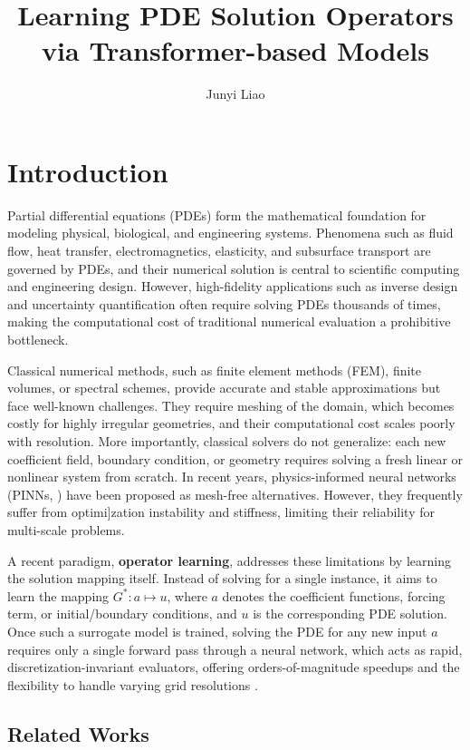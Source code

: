\documentclass[11pt]{article}
\title{\bf Learning PDE Solution Operators via Transformer-based Models}
\author{Junyi Liao}
\date{}
\begin{document}
\maketitle

\section{Introduction}
Partial differential equations (PDEs) form the mathematical foundation for modeling physical, biological, and engineering systems. Phenomena such as fluid flow, heat transfer, electromagnetics, elasticity, and subsurface transport are governed by PDEs, and their numerical solution is central to scientific computing and engineering design. However, high-fidelity applications such as inverse design and uncertainty quantification often require solving PDEs thousands of times, making the computational cost of traditional numerical evaluation a prohibitive bottleneck.

Classical numerical methods, such as finite element methods (FEM), finite volumes, or spectral schemes, provide accurate and stable approximations but face well-known challenges. They require meshing of the domain, which becomes costly for highly irregular geometries, and their computational cost scales poorly with resolution. More importantly, classical solvers do not generalize: each new coefficient field, boundary condition, or geometry requires solving a fresh linear or nonlinear system from scratch. In recent years, physics-informed neural networks (PINNs, \citealp{raissi2019physics}) have been proposed as mesh-free alternatives. However, they frequently suffer from optimi]zation instability and stiffness, limiting their reliability for multi-scale problems.

A recent paradigm, \textbf{operator learning}, addresses these limitations by learning the solution mapping itself. Instead of solving for a single instance, it  aims to learn the mapping $G^*:a\mapsto u$, where $a$ denotes the coefficient functions, forcing term, or initial/boundary conditions, and $u$ is the corresponding PDE solution. Once such a surrogate model is trained, solving the PDE for any new input $a$ requires only a single forward pass through a neural network, which acts as rapid, discretization-invariant evaluators, offering orders-of-magnitude speedups and the flexibility to handle varying grid resolutions .

\subsection{Related Works}
\end{document}
